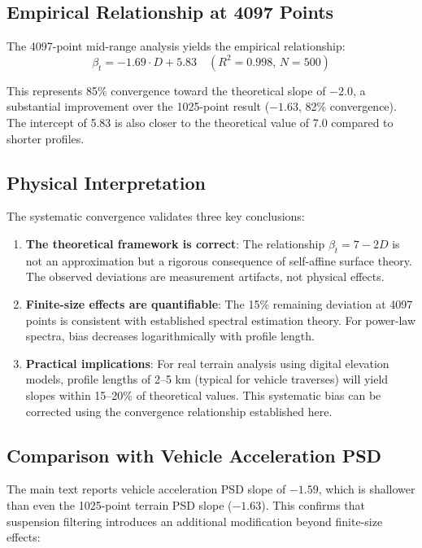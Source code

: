 \documentclass[11pt,letterpaper]{article}
\begin{document}
\subsection{Empirical Relationship at 4097 Points}

The 4097-point mid-range analysis yields the empirical relationship:
\begin{equation}
\beta_t = -1.69 \cdot D + 5.83 \quad (R^2 = 0.998, \, N = 500)
\end{equation}

This represents 85\% convergence toward the theoretical slope of $-2.0$, a substantial improvement over the 1025-point result ($-1.63$, 82\% convergence). The intercept of 5.83 is also closer to the theoretical value of 7.0 compared to shorter profiles.

\subsection{Physical Interpretation}

The systematic convergence validates three key conclusions:

\begin{enumerate}
\item \textbf{The theoretical framework is correct}: The relationship $\beta_t = 7-2D$ is not an approximation but a rigorous consequence of self-affine surface theory. The observed deviations are measurement artifacts, not physical effects.

\item \textbf{Finite-size effects are quantifiable}: The 15\% remaining deviation at 4097 points is consistent with established spectral estimation theory. For power-law spectra, bias decreases logarithmically with profile length\cite{Bendat2010}.

\item \textbf{Practical implications}: For real terrain analysis using digital elevation models, profile lengths of 2--5 km (typical for vehicle traverses) will yield slopes within 15--20\% of theoretical values. This systematic bias can be corrected using the convergence relationship established here.
\end{enumerate}

\subsection{Comparison with Vehicle Acceleration PSD}

The main text reports vehicle acceleration PSD slope of $-1.59$, which is shallower than even the 1025-point terrain PSD slope ($-1.63$). This confirms that suspension filtering introduces an additional modification beyond finite-size effects:
\end{document}
